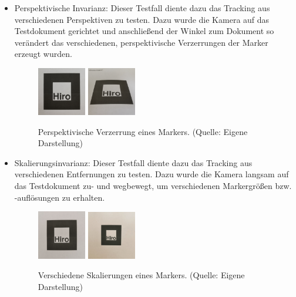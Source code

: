 \begin{itemize}
\item Perspektivische Invarianz: Dieser Testfall diente dazu das Tracking aus verschiedenen Perspektiven zu testen. Dazu wurde die Kamera auf das Testdokument gerichtet und anschließend der Winkel zum Dokument so verändert das verschiedenen, perspektivische Verzerrungen der Marker erzeugt wurden.

\begin{figure}[H]
	\centering
    \includegraphics[width=0.2\textwidth]{Abbildungen/Invarianz/Perspektive1.jpg}
    \includegraphics[width=0.2\textwidth]{Abbildungen/Invarianz/Perspektive2.jpg}
    \caption[Perspektiven eines Markers]{Perspektivische Verzerrung eines Markers. (Quelle: Eigene Darstellung)}
\end{figure}

\item Skalierungsinvarianz: Dieser Testfall diente dazu das Tracking aus verschiedenen Entfernungen zu testen. Dazu wurde die Kamera langsam auf das Testdokument zu- und wegbewegt, um verschiedenen Markergrößen bzw. -auflösungen zu erhalten.

\begin{figure}[H]
    \centering
    \includegraphics[width=0.2\textwidth]{Abbildungen/Invarianz/Skalierung1.jpg}
    \includegraphics[width=0.2\textwidth]{Abbildungen/Invarianz/Skalierung2.jpg}
    \caption[Skalierungen eines Markers]{Verschiedene Skalierungen eines Markers. (Quelle: Eigene Darstellung)}
\end{figure}


\end{itemize}
